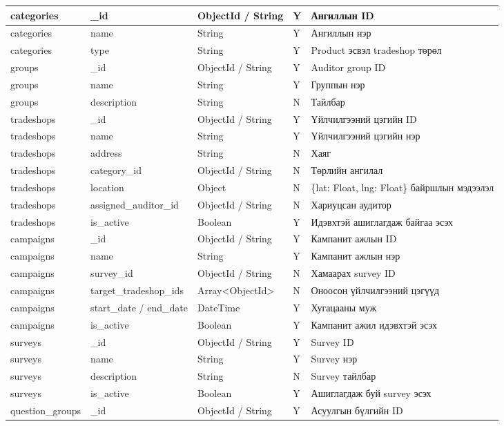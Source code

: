 \begin{longtable}{|P{0.14}|P{0.22}|P{0.15}|P{0.06}|P{0.35}|}
\hline
categories & \_id & ObjectId / String & Y & Ангиллын ID \\
\hline
categories & name & String & Y & Ангиллын нэр \\
\hline
categories & type & String & Y & Product эсвэл tradeshop төрөл \\
\hline
groups & \_id & ObjectId / String & Y & Auditor group ID \\
\hline
groups & name & String & Y & Группын нэр \\
\hline
groups & description & String & N & Тайлбар \\
\hline
tradeshops & \_id & ObjectId / String & Y & Үйлчилгээний цэгийн ID \\
\hline
tradeshops & name & String & Y & Үйлчилгээний цэгийн нэр \\
\hline
tradeshops & address & String & N & Хаяг \\
\hline
tradeshops & category\_id & ObjectId / String & N & Төрлийн ангилал \\
\hline
tradeshops & location & Object & N & \{lat: Float, lng: Float\} байршлын мэдээлэл \\
\hline
tradeshops & assigned\_auditor\_id & ObjectId / String & N & Хариуцсан аудитор \\
\hline
tradeshops & is\_active & Boolean & Y & Идэвхтэй ашиглагдаж байгаа эсэх \\
\hline
campaigns & \_id & ObjectId / String & Y & Кампанит ажлын ID \\
\hline
campaigns & name & String & Y & Кампанит ажлын нэр \\
\hline
campaigns & survey\_id & ObjectId / String & N & Хамаарах survey ID \\
\hline
campaigns & target\_tradeshop\_ids & Array<ObjectId> & N & Оноосон үйлчилгээний цэгүүд \\
\hline
campaigns & start\_date / end\_date & DateTime & Y & Хугацааны муж \\
\hline
campaigns & is\_active & Boolean & Y & Кампанит ажил идэвхтэй эсэх \\
\hline
surveys & \_id & ObjectId / String & Y & Survey ID \\
\hline
surveys & name & String & Y & Survey нэр \\
\hline
surveys & description & String & N & Survey тайлбар \\
\hline
surveys & is\_active & Boolean & Y & Ашиглагдаж буй survey эсэх \\
\hline
question\_groups & \_id & ObjectId / String & Y & Асуулгын бүлгийн ID \\

\end{longtable}
